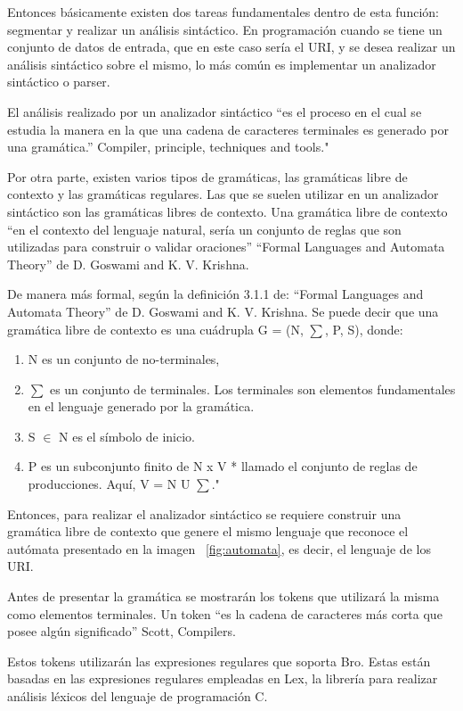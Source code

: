Entonces básicamente existen dos tareas fundamentales dentro de esta función: segmentar y realizar un análisis sintáctico. En programación cuando se tiene un conjunto de datos de entrada, que en este caso sería el URI, y se desea realizar un análisis sintáctico sobre el mismo, lo más común es implementar un analizador sintáctico o parser.

El análisis realizado por un analizador sintáctico “es el proceso en el cual se estudia la manera en la que una cadena de caracteres terminales es generado por una gramática.”  Compiler, principle, techniques and tools."

Por otra parte, existen varios tipos de gramáticas, las gramáticas libre de contexto y las gramáticas regulares. Las que se suelen utilizar en un analizador sintáctico son las gramáticas libres de contexto. Una gramática libre de contexto “en el contexto del lenguaje natural, sería un conjunto de reglas que son utilizadas para construir o validar oraciones” “Formal Languages and Automata Theory” de D. Goswami and K. V. Krishna. 

De manera más formal, según la definición 3.1.1 de: “Formal Languages and Automata Theory” de D. Goswami and K. V. Krishna. Se puede decir que una gramática libre de contexto es una  cuádrupla G = (N, $\sum$, P, S), donde:
\begin{enumerate}
\item N es un conjunto de no-terminales,
\item $\sum$ es un conjunto de terminales. Los terminales son elementos fundamentales en el lenguaje generado por la gramática.
\item S $\in$ N es el símbolo de inicio.
\item P es un subconjunto finito de N x V * llamado el conjunto de reglas de producciones. Aquí, V = N U $\sum$."
\end{enumerate}

Entonces, para realizar el analizador sintáctico se requiere construir una gramática libre de contexto que genere el mismo lenguaje que reconoce el autómata presentado en la imagen ~\ref{fig:automata}, es decir, el lenguaje de los URI.

Antes de presentar la gramática se mostrarán los tokens que utilizará la misma como elementos terminales. Un token “es la cadena de caracteres más corta que posee algún significado” Scott, Compilers.

Estos tokens utilizarán las expresiones regulares que soporta Bro. Estas están basadas en las expresiones regulares empleadas en Lex, la librería para realizar análisis léxicos del lenguaje de programación C.


